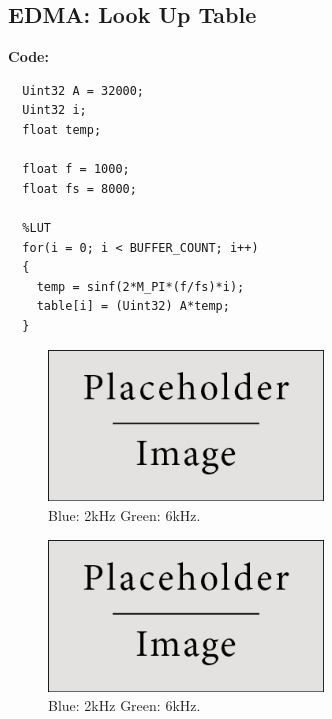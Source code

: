 \documentclass{article}
\begin{document}
\subsection{EDMA: Look Up Table}

\textbf{Code:}

\begin{verbatim}
  Uint32 A = 32000;
  Uint32 i;
  float temp;

  float f = 1000;
  float fs = 8000;

  %LUT
  for(i = 0; i < BUFFER_COUNT; i++)
  {
    temp = sinf(2*M_PI*(f/fs)*i);
    table[i] = (Uint32) A*temp;
  }
\end{verbatim}

\begin{figure}[h]
  \begin{center}
    \includegraphics[width=0.65\textwidth]{img/placeholder.jpg}
    \caption{Blue: 2kHz Green: 6kHz.}
  \end{center}
\end{figure}

\begin{figure}[h]
  \begin{center}
    \includegraphics[width=0.65\textwidth]{img/placeholder.jpg}
    \caption{Blue: 2kHz Green: 6kHz.}
  \end{center}
\end{figure}

\end{document}
